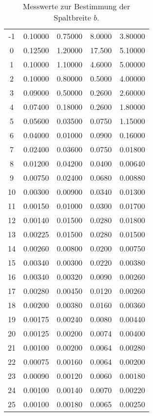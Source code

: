 \begin{table}
\begin{tabular}{c || c | c | c | c}
    -1	& 0.10000 & 0.75000 & 8.0000 & 3.80000 \\
    0	  & 0.12500 & 1.20000 & 17.500 & 5.10000 \\
    1	  & 0.10000 & 1.10000 & 4.6000 & 5.00000 \\
    2	  & 0.10000 & 0.80000 & 0.5000 & 4.00000 \\
    3	  & 0.09000 & 0.50000 & 0.2600 & 2.60000 \\
    4	  & 0.07400 & 0.18000 & 0.2600 & 1.80000 \\
    5	  & 0.05600 & 0.03500 & 0.0750 & 1.15000 \\
    6	  & 0.04000 & 0.01000 & 0.0900 & 0.16000 \\
    7	  & 0.02400 & 0.03600 & 0.0750 & 0.01800 \\
    8	  & 0.01200 & 0.04200 & 0.0400 & 0.00640 \\
    9	  & 0.00750 & 0.02400 & 0.0680 & 0.00880 \\
    10	& 0.00300 & 0.00900 & 0.0340 & 0.01300 \\
    11	& 0.00150 & 0.01000 & 0.0300 & 0.01700 \\
    12	& 0.00140 & 0.01500 & 0.0280 & 0.01800 \\
    13	& 0.00225 & 0.01500 & 0.0280 & 0.01500 \\
    14	& 0.00260 & 0.00800 & 0.0200 & 0.00750 \\
    15	& 0.00340 & 0.00300 & 0.0220 & 0.00380 \\
    16	& 0.00340 & 0.00320 & 0.0090 & 0.00260 \\
    17	& 0.00280 & 0.00450 & 0.0120 & 0.00260 \\
    18	& 0.00200 & 0.00380 & 0.0160 & 0.00360 \\
    19	& 0.00175 & 0.00240 & 0.0080 & 0.00440 \\
    20	& 0.00125 & 0.00200 & 0.0074 & 0.00400 \\
    21	& 0.00100 & 0.00200 & 0.0064 & 0.00280 \\
    22	& 0.00075 & 0.00160 & 0.0064 & 0.00200 \\
    23	& 0.00090 & 0.00120 & 0.0060 & 0.00180 \\
    24	& 0.00100 & 0.00140 & 0.0070 & 0.00220 \\
    25	& 0.00100 & 0.00180 & 0.0065 & 0.00250 \\
    \bottomrule
  \end{tabular}
  \caption{Messwerte zur Bestimmung der Spaltbreite $b$.}
  \label{tab:Spalt}
\end{table}
